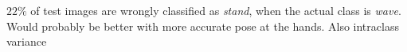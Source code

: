 

$22\%$ of test images are wrongly classified as \textit{stand}, when the actual class is \textit{wave}.
Would probably be better with more accurate pose at the hands.
Also intraclass variance




